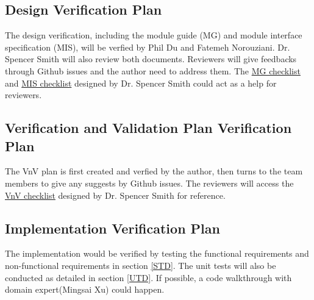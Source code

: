 \documentclass[12pt, titlepage]{article}
\begin{document}

\subsection{Design Verification Plan}\label{DVP}
The design verification, including the module guide (MG) and module interface specification (MIS), will be verfied by Phil Du and Fatemeh Norouziani. Dr. Spencer Smith will also review both documents. Reviewers will give feedbacks through Github issues and the author need to address them. The \href{https://github.com/CynthiaLiu0805/BridgeCorrosion/blob/main/docs/Checklists/MG-Checklist.pdf}{MG checklist} and \href{https://github.com/CynthiaLiu0805/BridgeCorrosion/blob/main/docs/Checklists/MIS-Checklist.pdf}{MIS checklist} designed by Dr. Spencer Smith could act as a help for reviewers.



\subsection{Verification and Validation Plan Verification Plan}\label{VnVP}
The VnV plan is first created and verfied by the author, then turns to the team members to give any suggests by Github issues. The reviewers will access the \href{https://github.com/CynthiaLiu0805/BridgeCorrosion/blob/main/docs/Checklists/VnV-Checklist.pdf}{VnV checklist} designed by Dr. Spencer Smith for reference.



\subsection{Implementation Verification Plan}\label{IVP}
The implementation would be verified by testing the functional requirements and non-functional requirements in section \ref{STD}. The unit tests will also be conducted as detailed in section \ref{UTD}. If possible, a code walkthrough with domain expert(Mingsai Xu) could happen.
\end{document}
